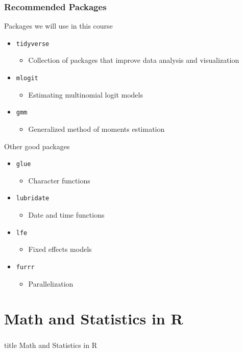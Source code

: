 \documentclass{beamer}
\begin{document}
\begin{frame}\frametitle{Recommended Packages}
    Packages we will use in this course
    \begin{itemize}
        \item \texttt{tidyverse}
        \begin{itemize}
            \item Collection of packages that improve data analysis and visualization
        \end{itemize}
        \item \texttt{mlogit}
        \begin{itemize}
            \item Estimating multinomial logit models
        \end{itemize}
        \item \texttt{gmm}
        \begin{itemize}
            \item Generalized method of moments estimation
        \end{itemize}
    \end{itemize}
    \vspace{0.5ex}
    Other good packages
    \begin{itemize}
        \item \texttt{glue}
        \begin{itemize}
            \item Character functions
        \end{itemize}
        \item \texttt{lubridate}
        \begin{itemize}
            \item Date and time functions
        \end{itemize}
        \item \texttt{lfe}
        \begin{itemize}
            \item Fixed effects models
        \end{itemize}
        \item \texttt{furrr}
        \begin{itemize}
            \item Parallelization
        \end{itemize}
    \end{itemize}
\end{frame}

\section{Math and Statistics in R}
\label{math}
\begin{frame}\frametitle{}
    \vfill
    \centering
    \begin{beamercolorbox}[center]{title}
        \Large Math and Statistics in R
    \end{beamercolorbox}
    \vfill
\end{frame}
\end{document}
